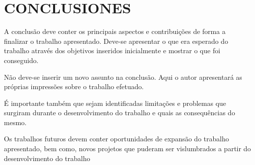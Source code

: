 \section{CONCLUSIONES}
A conclusão deve conter os principais aspectos e contribuições de forma a finalizar o trabalho apresentado. Deve-se apresentar o que era esperado do trabalho através dos objetivos inseridos inicialmente e mostrar o que foi conseguido. 

	Não deve-se inserir um novo assunto na conclusão. Aqui o autor apresentará as próprias impressões sobre o trabalho efetuado. 
    
É importante também que sejam identificadas limitações e problemas que surgiram durante o desenvolvimento do trabalho e quais as consequências do mesmo.

Os trabalhos futuros devem conter oportunidades de expansão do trabalho apresentado, bem como, novos projetos que puderam ser vislumbrados a partir do desenvolvimento do trabalho